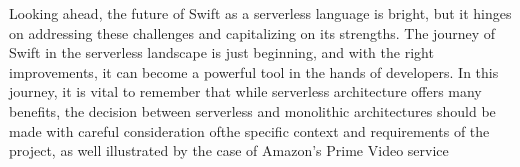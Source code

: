 Looking ahead, the future of Swift as a serverless language is bright, but it hinges on addressing these challenges and capitalizing on its strengths. The journey of Swift in the serverless landscape is just beginning, and with the right improvements, it can become a powerful tool in the hands of developers. In this journey, it is vital to remember that while serverless architecture offers many benefits, the decision between serverless and monolithic architectures should be made with careful consideration ofthe specific context and requirements of the project, as well illustrated by the case of Amazon's Prime Video service